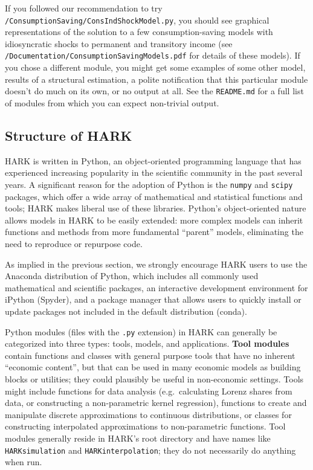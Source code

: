 \documentclass[12pt,titlepage,letterpaper]{econtex}
\begin{document}
If you followed our recommendation to try \texttt{/ConsumptionSaving/ConsIndShockModel.py}, you should see graphical representations of the solution to a few consumption-saving models with idiosyncratic shocks to permanent and transitory income (see \texttt{/Documentation/ConsumptionSavingModels.pdf} for details of these models).  If you chose a different module, you might get some examples of some other model, results of a structural estimation, a polite notification that this particular module doesn't do much on its own, or no output at all.  See the \texttt{README.md} for a full list of modules from which you can expect non-trivial output.

\subsection{Structure of HARK}\label{sec:StructureOfHARK}

HARK is written in Python, an object-oriented programming language that has experienced increasing popularity in the scientific community in the past several years.  A significant reason for the adoption of Python is the \texttt{numpy} and \texttt{scipy} packages, which offer a wide array of mathematical and statistical functions and tools; HARK makes liberal use of these libraries.  Python's object-oriented nature allows models in HARK to be easily extended: more complex models can inherit functions and methods from more fundamental ``parent'' models, eliminating the need to reproduce or repurpose code.

As implied in the previous section, we strongly encourage HARK users to use the Anaconda distribution of Python, which includes all commonly used mathematical and scientific packages, an interactive development environment for iPython (Spyder), and a package manager that allows users to quickly install or update packages not included in the default distribution (conda).

Python modules (files with the \texttt{.py} extension) in HARK can generally be categorized into three types: tools, models, and applications.  \textbf{Tool modules} contain functions and classes with general purpose tools that have no inherent ``economic content'', but that can be used in many economic models as building blocks or utilities; they could plausibly be useful in non-economic settings.  Tools might include functions for data analysis (e.g.\ calculating Lorenz shares from data, or constructing a non-parametric kernel regression), functions to create and manipulate discrete approximations to continuous distributions, or classes for constructing interpolated approximations to non-parametric functions.  Tool modules generally reside in HARK's root directory and have names like \texttt{HARKsimulation} and \texttt{HARKinterpolation}; they do not necessarily do anything when run.
\end{document}
